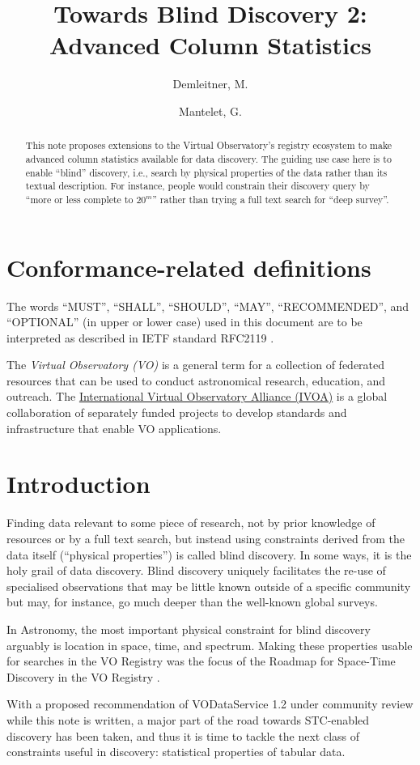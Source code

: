 \documentclass[11pt,a4paper]{ivoa}
\title{Towards Blind Discovery 2: Advanced Column Statistics}
\author[https://wiki.ivoa.net/twiki/bin/view/IVOA/MarkusDemleitner]{Demleitner, M.}
\author[https://wiki.ivoa.net/twiki/bin/view/IVOA/GregoryMantelet]{Mantelet, G.}
\begin{document}
\begin{abstract}
This note proposes extensions to the Virtual Observatory's registry
ecosystem to make advanced column statistics available for data
discovery.  The guiding use case here is to enable ``blind'' discovery,
i.e., search by physical properties of the data rather
than its textual description. For instance, people would constrain their
discovery query by ``more or less complete to $20^m$'' rather than
trying a full text search for ``deep survey''.
\end{abstract}


\section*{Conformance-related definitions}

The words ``MUST'', ``SHALL'', ``SHOULD'', ``MAY'', ``RECOMMENDED'', and
``OPTIONAL'' (in upper or lower case) used in this document are to be
interpreted as described in IETF standard RFC2119 \citep{std:RFC2119}.

The \emph{Virtual Observatory (VO)} is a
general term for a collection of federated resources that can be used
to conduct astronomical research, education, and outreach.
The \href{http://www.ivoa.net}{International
Virtual Observatory Alliance (IVOA)} is a global
collaboration of separately funded projects to develop standards and
infrastructure that enable VO applications.


\section{Introduction}


Finding data relevant to some piece of research, not by prior knowledge of
resources or by a full text search, but instead using constraints derived from
the data itself (“physical properties”) is called blind discovery. In some ways,
it is the holy grail of data discovery. Blind discovery uniquely facilitates the
re-use of specialised observations that may be little known outside of a specific
community but may, for instance, go much deeper than the well-known global
surveys.

In Astronomy, the most important physical constraint for blind discovery
arguably is location in space, time, and spectrum.  Making these
properties usable for searches in the VO Registry was the focus of the
Roadmap for Space-Time Discovery in the VO Registry \citep{std:stcReg}.

With a proposed recommendation of VODataService 1.2 \citep{pr:VODS12}
under community review while this note is written, a major part of the
road towards STC-enabled discovery has been taken, and thus it is time
to tackle the next class of constraints useful in discovery: statistical
properties of tabular data.
\end{document}
